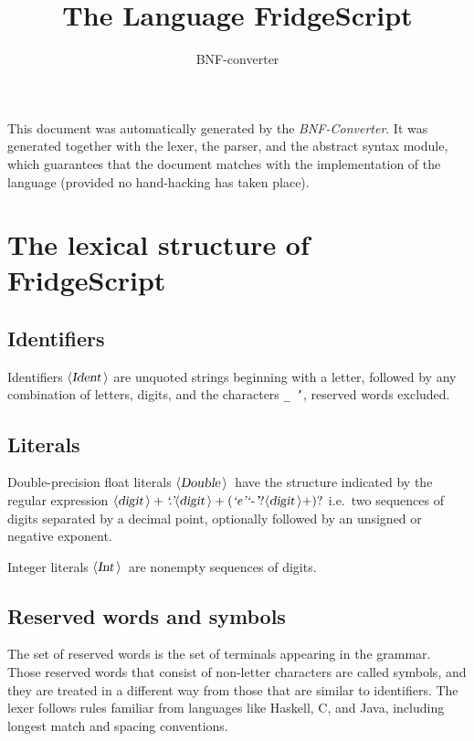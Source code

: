 \documentclass[a4paper,11pt]{article}
\author{BNF-converter}
\title{The Language FridgeScript}
\begin{document}
\maketitle

\newcommand{\emptyP}{\mbox{$\epsilon$}}
\newcommand{\terminal}[1]{\mbox{{\texttt {#1}}}}
\newcommand{\nonterminal}[1]{\mbox{$\langle \mbox{{\sl #1 }} \! \rangle$}}
\newcommand{\arrow}{\mbox{::=}}
\newcommand{\delimit}{\mbox{$|$}}
\newcommand{\reserved}[1]{\mbox{{\texttt {#1}}}}
\newcommand{\literal}[1]{\mbox{{\texttt {#1}}}}
\newcommand{\symb}[1]{\mbox{{\texttt {#1}}}}

This document was automatically generated by the {\em BNF-Converter}. It was generated together with the lexer, the parser, and the abstract syntax module, which guarantees that the document matches with the implementation of the language (provided no hand-hacking has taken place).

\section*{The lexical structure of FridgeScript}
\subsection*{Identifiers}
Identifiers \nonterminal{Ident} are unquoted strings beginning with a letter,
followed by any combination of letters, digits, and the characters {\tt \_ '},
reserved words excluded.


\subsection*{Literals}
Double-precision float literals \nonterminal{Double}\ have the structure
indicated by the regular expression $\nonterminal{digit}+ \mbox{{\it `.'}} \nonterminal{digit}+ (\mbox{{\it `e'}} \mbox{{\it `-'}}? \nonterminal{digit}+)?$ i.e.\
two sequences of digits separated by a decimal point, optionally
followed by an unsigned or negative exponent.


Integer literals \nonterminal{Int}\ are nonempty sequences of digits.




\subsection*{Reserved words and symbols}
The set of reserved words is the set of terminals appearing in the grammar. Those reserved words that consist of non-letter characters are called symbols, and they are treated in a different way from those that are similar to identifiers. The lexer follows rules familiar from languages like Haskell, C, and Java, including longest match and spacing conventions.
\end{document}
